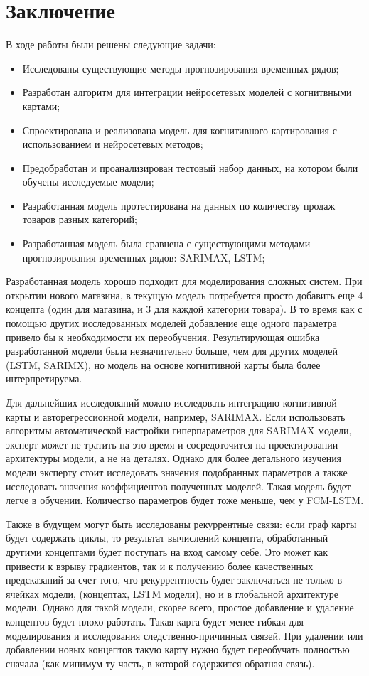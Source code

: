 \chapter*{Заключение}

В ходе работы были решены следующие задачи:

\begin{itemize}
	\item Исследованы существующие методы прогнозирования временных рядов;
	\item Разработан алгоритм для интеграции нейросетевых моделей с когнитвными картами;
	\item Спроектирована и реализована модель для когнитивного картирования с использованием
	и нейросетевых методов;
	\item Предобработан и проанализирован тестовый набор данных, на котором были обучены исследуемые модели;
	\item Разработанная модель протестирована на данных по количеству продаж товаров разных категорий;
	\item Разработанная модель была сравнена с существующими методами
	прогнозирования временных рядов: SARIMAX, LSTM;
\end{itemize}

Разработанная модель хорошо подходит для моделирования сложных систем.
При открытии нового магазина, в текущую модель потребуется просто добавить еще
4 концепта (один для магазина, и 3 для каждой категории товара). В то время
как с помощью других исследованных моделей добавление еще одного параметра
привело бы к необходимости их переобучения.
Результирующая ошибка разработанной модели была незначительно больше,
чем для других моделей (LSTM, SARIMX), но модель на основе когнитивной карты
была более интерпретируема.

Для дальнейших исследований можно исследовать интеграцию когнитивной карты
и авторегрессионной модели, например, SARIMAX. Если использовать алгоритмы
автоматической настройки гиперпараметров для SARIMAX модели, эксперт может не тратить
на это время и сосредоточится на проектировании архитектуры модели, а не на деталях.
Однако для более детального изучения модели эксперту стоит исследовать
значения подобранных параметров а также исследовать значения
коэффициентов полученных моделей. Такая модель будет легче в
обучении. Количество параметров будет тоже меньше, чем у FCM-LSTM.

Также в будущем могут быть исследованы рекуррентные связи:
если граф карты будет содержать циклы, то результат вычислений
концепта, обработанный другими концептами будет поступать на вход
самому себе. Это может как привести к взрыву градиентов, так и к
получению более качественных предсказаний за счет того, что рекуррентность
будет заключаться не только в ячейках модели, (концептах, LSTM модели), но и в
глобальной архитектуре модели. Однако для такой модели, скорее всего,
простое добавление и удаление концептов будет плохо работать. Такая карта будет
менее гибкая для моделирования и исследования следственно-причинных связей.
При удалении или добавлении новых концептов такую карту нужно будет переобучать полностью
сначала (как минимум ту часть, в которой содержится обратная связь).


